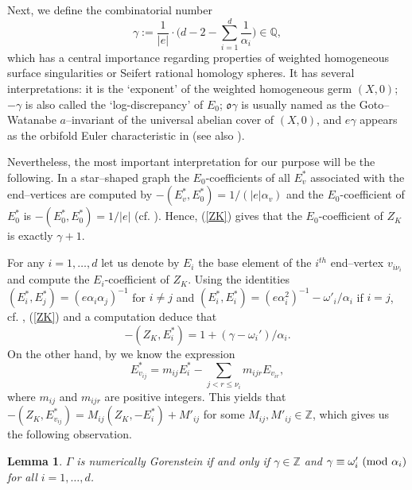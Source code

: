 \documentclass[oneside]{amsart}
\numberwithin{equation}{section}
\numberwithin{equation}{subsection}
\theoremstyle{plain}
\newtheorem{lemma}[equation]{Lemma}
\theoremstyle{definition}
\begin{document}
Next, we define the combinatorial number
\begin{equation}\label{eq:gamma}
\gamma:=\frac{1}{|e|}\cdot \Big( d-2-\sum_{i=1}^d \frac{1}{\alpha_i}\Big)\in \mathbb{Q},
\end{equation}
which has a central importance  regarding properties of
weighted homogeneous surface singularities or Seifert rational homology spheres.
It has several interpretations: it is the `exponent' of the weighted
homogeneous germ $(X,0)$; $-\gamma$ is also called the `log-discrepancy' of $E_0$; $\mathfrak{o}\gamma$ is usually named as the Goto--Watanabe $a$--invariant  of the universal abelian
cover of $(X,0)$, and $e\gamma$ appears as the orbifold Euler characteristic in \cite{neumann.abel} (see also
\cite[3.3.6]{art_nem_emb}). 

Nevertheless, the most important interpretation for our purpose will be  the following. In a star--shaped graph the $E_0$-coefficients of all
 $E^*_v$ associated with the end--vertices   are computed by $-(E_v^*,E^*_0)=1/(|e|\alpha_v)$ and the
 $E_0$-coefficient of
 $E^*_0$ is  $-(E_0^*,E^*_0)=1/|e|$
 (cf. \cite[(11.1)]{NOSZ}).
 Hence,  (\ref{ZK}) gives that the $E_0$-coefficient of $Z_K$ is exactly $\gamma+1$.

For any $i=1,\dots,d$ let us denote by $E_i$ the base element of the $i^{th}$ end--vertex $v_{i\nu_i}$ and compute the $E_i$-coefficient of $Z_K$. 
Using the identities $(E_i^*,E_j^*)=(e\alpha_i\alpha_j)^{-1}$ for $i\not=j$ and
$(E_i^*,E_i^*)=(e\alpha_i^2)^{-1}-\omega'_i/\alpha_i$ if $i=j$, 
 cf. \cite[(11.1)]{NOSZ}, 
 (\ref{ZK}) and a computation deduce that 
 \begin{equation}\label{eq:ZKend}
 -(Z_K,E^*_i)=1+(\gamma-\omega_i')/\alpha_i.
 \end{equation}
On the other hand, by \cite[Lemma 2.2.1]{LSz_module}  we know the  expression
$$E^*_{v_{ij}}=m_{ij}E^*_i-\sum_{j<r\leq \nu_i}m_{ijr}E_{v_{ir}},$$
where $m_{ij}$ and $m_{ijr}$ are positive integers. This yields that $-(Z_K,E^*_{v_{ij}})=M_{ij}(Z_K,-E^*_i)+M'_{ij}$ for some $M_{ij},M'_{ij}\in\mathbb{Z}$, which gives us the following observation.
\begin{lemma}\label{lem:ngor}
$\Gamma$ is numerically Gorenstein if and only if  $\gamma\in \mathbb{Z}$ and $\gamma\equiv\omega_i'\ ({\rm mod}\ \alpha_i)$ for all $i=1,\dots,d$.
\end{lemma}
\end{document}
